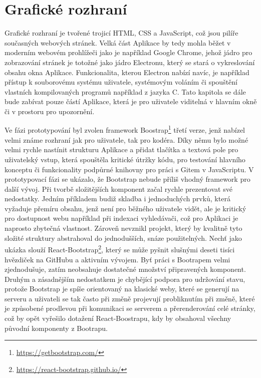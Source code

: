 \chapter{Grafické rozhraní}

Grafické rozhraní je tvořené trojicí HTML, CSS a JavaScript, což jsou pilíře současných webových stránek. Velká část Aplikace by tedy mohla běžet v moderním webovém prohlížeči jako je například Google Chrome, jehož jádro pro zobrazování stránek je totožné jako jádro Electronu, který se stará o vykreslování obsahu okna Aplikace. Funkcionalita, kterou Electron nabízí navíc, je například přístup k souborovému systému uživatele, systémovým voláním či spouštění vlastních kompilovaných programů například z jazyka C. Tato kapitola se dále bude zabívat pouze částí Aplikace, která je pro uživatele viditelná v hlavním okně či v prostoru pro upozornění.

Ve fázi prototypování byl zvolen framework Boostrap\footnote{\url{https://getbootstrap.com/}} třetí verze, jenž nabízel velmi známe rozhraní jak pro uživatele, tak pro kodéra. Díky němu bylo možné velmi rychle nastínit strukturu Aplikace a přidat tlačítka a textová pole pro uživatelský vstup, která spouštěla kritické útržky kódu, pro testování hlavního konceptu či funkcionality podpůrné knihovny pro práci s Gitem v JavaScriptu. V prototypovací fázi se ukázalo, že Bootstrap nebude příliš vhodný framework pro další vývoj. Při tvorbě složitějších komponent začal rychle prezentovat své nedostatky. Jedním příkladem budiž skladba i jednoduchých prvků, která vyžaduje přemíru obsahu, jenž není pro běžného uživatele vidět, ale je kritický pro dostupnost webu například při indexaci vyhledávači, což pro Aplikaci je naprosto zbytečná vlastnost. Zároveň nevznikl projekt, který by kvalitně tyto složité struktury abstrahoval do jednodušších, snáze použitelných. Nechť jako ukázka slouží React-Bootstrap\footnote{\url{https://react-bootstrap.github.io/}}, který se může pyšnit slušnými deseti tisíci hvězdiček na GitHubu a aktivním vývojem. Byť práci s Bootrapem velmi zjednodušuje, zatím neobsahuje dostatečné množství připravených komponent. Druhým a zásadnějším nedostatkem je chybějící podpora pro udržování stavu, protože Bootstrap je spíše orientovaný na klasické weby, které se generují na serveru a uživateli se tak často při změně projevují probliknutím při změně, které je způsobené prodlevou při komunikaci se serverem a přerenderování celé stránky, což by opět vyřešilo dotažení React-Boostrapu, kdy by obsahoval všechny původní komponenty z Bootrapu.

